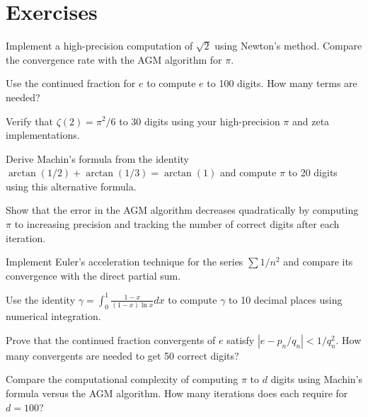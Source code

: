 \section{Exercises}

\begin{exercise}
Implement a high-precision computation of $\sqrt{2}$ using Newton's method. Compare the convergence rate with the AGM algorithm for $\pi$.
\end{exercise}

\begin{exercise}
Use the continued fraction for $e$ to compute $e$ to 100 digits. How many terms are needed?
\end{exercise}

\begin{exercise}
Verify that $\zeta(2) = \pi^2/6$ to 30 digits using your high-precision $\pi$ and zeta implementations.
\end{exercise}

\begin{exercise}
Derive Machin's formula from the identity $\arctan(1/2) + \arctan(1/3) = \arctan(1)$ and compute $\pi$ to 20 digits using this alternative formula.
\end{exercise}

\begin{exercise}
Show that the error in the AGM algorithm decreases quadratically by computing $\pi$ to increasing precision and tracking the number of correct digits after each iteration.
\end{exercise}

\begin{exercise}
Implement Euler's acceleration technique for the series $\sum 1/n^2$ and compare its convergence with the direct partial sum.
\end{exercise}

\begin{exercise}
Use the identity $\gamma = \int_0^1 \frac{1-x}{(1-x)\ln x} dx$ to compute $\gamma$ to 10 decimal places using numerical integration.
\end{exercise}

\begin{exercise}
Prove that the continued fraction convergents of $e$ satisfy $|e - p_n/q_n| < 1/q_n^2$. How many convergents are needed to get 50 correct digits?
\end{exercise}

\begin{exercise}
Compare the computational complexity of computing $\pi$ to $d$ digits using Machin's formula versus the AGM algorithm. How many iterations does each require for $d = 100$?
\end{exercise}

